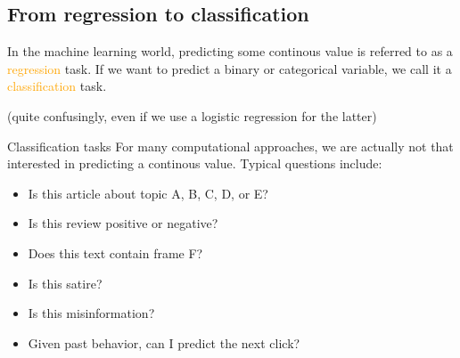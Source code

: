 \subsection{From regression to classification}

\begin{frame}[standout]
	In the machine learning world, predicting some continous value is referred to as a \textcolor{orange}{regression} task. If we want to predict a binary or categorical variable, we call it a \textcolor{orange}{classification} task.
	
	(quite confusingly, even if we use a logistic regression for the latter)
\end{frame}


\begin{frame}{Classification tasks}
	For many computational approaches, we are actually not that interested in predicting a continous value. Typical questions include:
	\begin{itemize}
		\item Is this article about topic A, B, C, D, or E?
		\item Is this review positive or negative?
		\item Does this text contain frame F?
		\item Is this satire? 
		\item Is this misinformation?
		\item Given past behavior, can I predict the next click?
	\end{itemize}
\end{frame}



